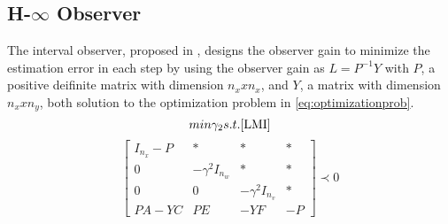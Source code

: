 \subsection{H-$\infty$ Observer}
The interval observer, proposed in \cite{Tang2019}, designs the observer gain to minimize the estimation error in each step by using the observer gain as $L= P^{-1}Y$ with $P$, a positive deifinite matrix with dimension $n_x x n_x$, and $Y$, a matrix with dimension $n_x x n_y$, both solution to the optimization problem in \eqref{eq:optimizationprob}.
\begin{equation}
\label{eq:optimizationprob}
min \gamma _2 \\
s.t. \ref{LMI}
\end{equation} 
\begin{equation}
\label{LMI}
\left[\begin{matrix}
I_{n_x} -P & * & * & *\\
0 & -\gamma ^2 I_{n_w} & * &* \\
0 & 0 & -\gamma ^2 I_{n_v} & *\\
PA-YC & PE & -YF & -P
\end{matrix}\right]  \prec 0
\end{equation} 
